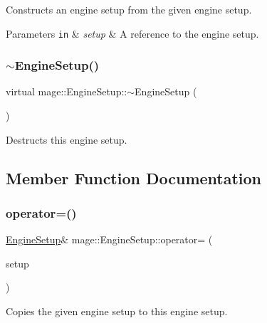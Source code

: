 Constructs an engine setup from the given engine setup.


\begin{DoxyParams}[1]{Parameters}
\mbox{\tt in}  & {\em setup} & A reference to the engine setup. \\
\hline
\end{DoxyParams}
\hypertarget{structmage_1_1_engine_setup_a6a3a5afe40b976946699f69504b0a5e9}{}\label{structmage_1_1_engine_setup_a6a3a5afe40b976946699f69504b0a5e9} 
\subsubsection{\texorpdfstring{$\sim$\+Engine\+Setup()}{~EngineSetup()}}
{\footnotesize\ttfamily virtual mage\+::\+Engine\+Setup\+::$\sim$\+Engine\+Setup (\begin{DoxyParamCaption}{ }\end{DoxyParamCaption})\hspace{0.3cm}{\ttfamily [virtual]}}

Destructs this engine setup. 

\subsection{Member Function Documentation}
\hypertarget{structmage_1_1_engine_setup_aa4db9097cc627e5e543333b7f21f7cd6}{}\label{structmage_1_1_engine_setup_aa4db9097cc627e5e543333b7f21f7cd6} 
\subsubsection{\texorpdfstring{operator=()}{operator=()}}
{\footnotesize\ttfamily \hyperlink{structmage_1_1_engine_setup}{Engine\+Setup}\& mage\+::\+Engine\+Setup\+::operator= (\begin{DoxyParamCaption}\item[{const \hyperlink{structmage_1_1_engine_setup}{Engine\+Setup} \&}]{setup }\end{DoxyParamCaption})\hspace{0.3cm}{\ttfamily [private]}}

Copies the given engine setup to this engine setup.


